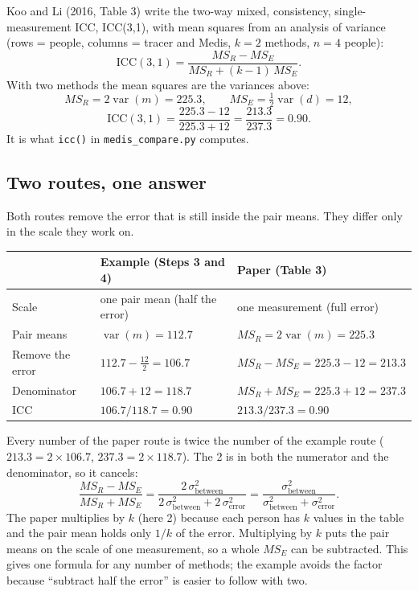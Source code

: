 \documentclass[11pt]{article}
\begin{document}
Koo and Li (2016, Table 3) write the two-way mixed, consistency, single-measurement ICC, ICC(3,1), with mean
squares from an analysis of variance (rows = people, columns = tracer and Medis, $k = 2$ methods, $n = 4$ people):
\[
  \text{ICC}(3,1) = \frac{MS_R - MS_E}{MS_R + (k-1)\,MS_E}.
\]
With two methods the mean squares are the variances above:
\[
  MS_R = 2 \operatorname{var}(m) = 225.3, \qquad MS_E = \tfrac12 \operatorname{var}(d) = 12,
\]
\[
  \text{ICC}(3,1) = \frac{225.3 - 12}{225.3 + 12} = \frac{213.3}{237.3} = 0.90 .
\]
It is what \texttt{icc()} in \texttt{medis\_compare.py} computes.

\subsection*{Two routes, one answer}

Both routes remove the error that is still inside the pair means. They differ only in the scale they work on.

\begin{center}
\begin{tabular}{lll}
  \toprule
  & Example (Steps 3 and 4) & Paper (Table 3) \\
  \midrule
  Scale & one pair mean (half the error) & one measurement (full error) \\
  Pair means & $\operatorname{var}(m) = 112.7$ & $MS_R = 2\operatorname{var}(m) = 225.3$ \\
  Remove the error & $112.7 - \tfrac{12}{2} = 106.7$ & $MS_R - MS_E = 225.3 - 12 = 213.3$ \\
  Denominator & $106.7 + 12 = 118.7$ & $MS_R + MS_E = 225.3 + 12 = 237.3$ \\
  ICC & $106.7 / 118.7 = 0.90$ & $213.3 / 237.3 = 0.90$ \\
  \bottomrule
\end{tabular}
\end{center}

Every number of the paper route is twice the number of the example route ($213.3 = 2 \times 106.7$,
$237.3 = 2 \times 118.7$). The 2 is in both the numerator and the denominator, so it cancels:
\[
  \frac{MS_R - MS_E}{MS_R + MS_E}
  = \frac{2\,\sigma^2_{\text{between}}}{2\,\sigma^2_{\text{between}} + 2\,\sigma^2_{\text{error}}}
  = \frac{\sigma^2_{\text{between}}}{\sigma^2_{\text{between}} + \sigma^2_{\text{error}}} .
\]
The paper multiplies by $k$ (here 2) because each person has $k$ values in the table and the pair mean holds only
$1/k$ of the error. Multiplying by $k$ puts the pair means on the scale of one measurement, so a whole $MS_E$ can
be subtracted. This gives one formula for any number of methods; the example avoids the factor because
``subtract half the error'' is easier to follow with two.
\end{document}
